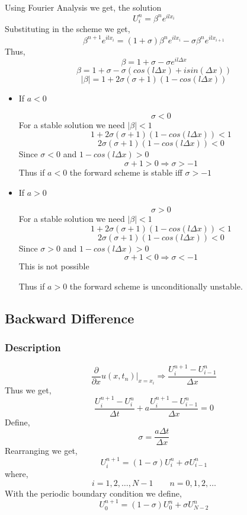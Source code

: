 \documentclass[11pt]{article}
\begin{document}
Using Fourier Analysis we get, the solution
$$U_i^n = \beta^n e^{i l x_i}$$
Substituting in the scheme we get,
$$\beta^{n+1} e^{i l x_i} = \left( 1 + \sigma \right) \beta^n e^{i l x_i} - \sigma \beta^n e^{i l x_{i+1}}$$
Thus,
$$\beta = 1 + \sigma - \sigma e^{i l \Delta x}$$
$$\beta = 1 + \sigma - \sigma \left( cos(l \Delta x) + i sin(\Delta x) \right)$$
$$\lvert \beta \rvert = 1 + 2 \sigma \left( \sigma +1 \right) \left( 1 - cos(l \Delta x) \right)$$

\begin{itemize}
\item If \(a<0\)

$$\sigma < 0$$
For a stable solution we need \(\lvert \beta \rvert < 1\)
$$1 + 2 \sigma \left( \sigma +1 \right) \left( 1 - cos(l \Delta x) \right) <1$$
$$2 \sigma \left( \sigma +1 \right) \left( 1 - cos(l \Delta x) \right) <0$$
Since \(\sigma <0\) and \(1 - cos(l \Delta x) > 0\)
$$\sigma + 1 > 0 \Rightarrow \sigma > -1$$
Thus if \(a<0\) the forward scheme is stable iff \(\sigma > -1\)

\item If \(a>0\)

$$\sigma > 0$$
For a stable solution we need \(\lvert \beta \rvert < 1\)
$$1 + 2 \sigma \left( \sigma +1 \right) \left( 1 - cos(l \Delta x) \right) <1$$
$$2 \sigma \left( \sigma +1 \right) \left( 1 - cos(l \Delta x) \right) <0$$
Since \(\sigma >0\) and \(1 - cos(l \Delta x) > 0\)
$$\sigma + 1<0 \Rightarrow \sigma < -1$$
This is not possible

Thus if \(a>0\) the forward scheme is unconditionally unstable.
\end{itemize}
\subsection{Backward Difference}
\label{sec:orga858f21}
\subsubsection{Description}
\label{sec:org38701a5}
$$\frac{\partial}{\partial x} u(x,t_n) \bigg|_{x=x_i} \Rightarrow \frac{U_i^{n+1} - U_{i-1}^n}{\Delta x}$$
Thus we get,
$$\frac{U_i^{n+1} - U_i^n}{\Delta t} + a \frac{U_i^{n+1} - U_{i-1}^n}{\Delta x} = 0$$
Define,
$$\sigma = \frac{a \Delta t}{\Delta x}$$
Rearranging we get,
$$U_i^{n+1} = \left( 1 - \sigma \right) U_i^n + \sigma U_{i-1}^n$$
where,
$$i=1,2,\ldots,N-1 \qquad n = 0,1,2,\ldots$$
With the periodic boundary condition we define,
$$U_{0}^{n+1} = \left( 1 - \sigma \right) U_{0}^n + \sigma U_{N-2}^n$$
\end{document}
